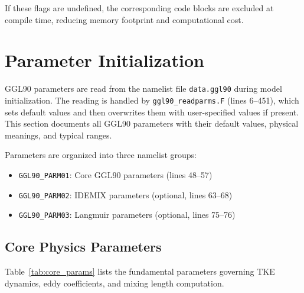\documentclass[12pt,letterpaper]{article}
\begin{document}
If these flags are undefined, the corresponding code blocks are excluded at
compile time, reducing memory footprint and computational cost.

\section{Parameter Initialization}

GGL90 parameters are read from the namelist file \texttt{data.ggl90} during
model initialization. The reading is handled by \texttt{ggl90\_readparms.F}
(lines 6--451), which sets default values and then overwrites them with
user-specified values if present. This section documents all GGL90 parameters
with their default values, physical meanings, and typical ranges.

Parameters are organized into three namelist groups:
\begin{itemize}[leftmargin=*]
  \item \texttt{GGL90\_PARM01}: Core GGL90 parameters (lines 48--57)
  \item \texttt{GGL90\_PARM02}: IDEMIX parameters (optional, lines 63--68)
  \item \texttt{GGL90\_PARM03}: Langmuir parameters (optional, lines 75--76)
\end{itemize}

\subsection{Core Physics Parameters}

Table~\ref{tab:core_params} lists the fundamental parameters governing TKE
dynamics, eddy coefficients, and mixing length computation.
\end{document}
